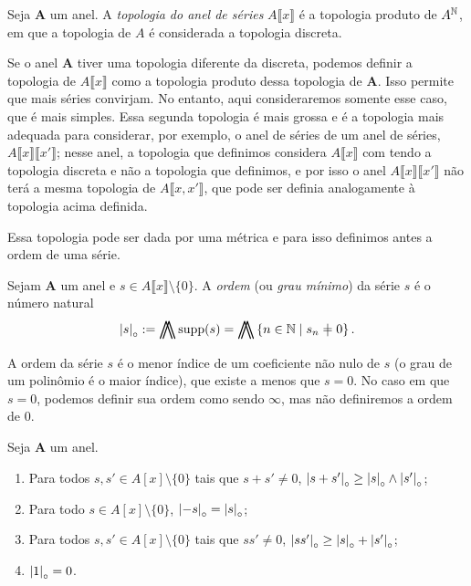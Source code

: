\begin{definition}
Seja $\bm A$ um anel. A \emph{topologia do anel de séries} $A\llbracket x \rrbracket$ é a topologia produto de $A^{\mathbb{N}}$, em que a topologia de $A$ é considerada a topologia discreta.
\end{definition}

Se o anel $\bm A$ tiver uma topologia diferente da discreta, podemos definir a topologia de $A\llbracket x \rrbracket$ como a topologia produto dessa topologia de $\bm A$. Isso permite que mais séries convirjam. No entanto, aqui consideraremos somente esse caso, que é mais simples. Essa segunda topologia é mais grossa e é a topologia mais adequada para considerar, por exemplo, o anel de séries de um anel de séries, $A\llbracket x \rrbracket\llbracket x' \rrbracket$; nesse anel, a topologia que definimos considera $A\llbracket x \rrbracket$ com tendo a topologia discreta e não a topologia que definimos, e por isso o anel $A\llbracket x \rrbracket\llbracket x' \rrbracket$ não terá a mesma topologia de $A\llbracket x, x' \rrbracket$, que pode ser definia analogamente à topologia acima definida.

Essa topologia pode ser dada por uma métrica e para isso definimos antes a ordem de uma série.

\begin{definition}
Sejam $\bm A$ um anel e $s \in A\llbracket x \rrbracket \setminus \{0\}$. A \emph{ordem} (ou \emph{grau mínimo}) da série $s$ é o número natural
	\begin{equation*}
	\ords{s} := \min\supp(s) = \min\set{n \in \N}{s_n \neq 0}.
	\end{equation*}
\end{definition}

A ordem da série $s$ é o menor índice de um coeficiente não nulo de $s$ (o grau de um polinômio é o maior índice), que existe a menos que $s = 0$. No caso em que $s=0$, podemos definir sua ordem como sendo $\infty$, mas não definiremos a ordem de $0$.

\begin{exercise}
Seja $\bm A$ um anel.
	\begin{enumerate}
	\item Para todos $s,s' \in A[x] \setminus \{0\}$ tais que $s+s'\neq 0$, $\left\vert{s+s'}\right\vert_{\circ} \geq \left\vert{s}\right\vert_{\circ} \mathbin{\wedge} \left\vert{s'}\right\vert_{\circ}$;
	\item Para todo $s \in A[x] \setminus \{0\}$, $\left\vert{-s}\right\vert_{\circ} = \left\vert{s}\right\vert_{\circ}$;
	\item Para todos $s,s' \in A[x] \setminus \{0\}$ tais que $ss' \neq 0$, $\left\vert{ss'}\right\vert_{\circ} \geq \left\vert{s}\right\vert_{\circ} + \left\vert{s'}\right\vert_{\circ}$;
	\item $\left\vert{1}\right\vert_{\circ}=0$.
	\end{enumerate}
\end{exercise}

